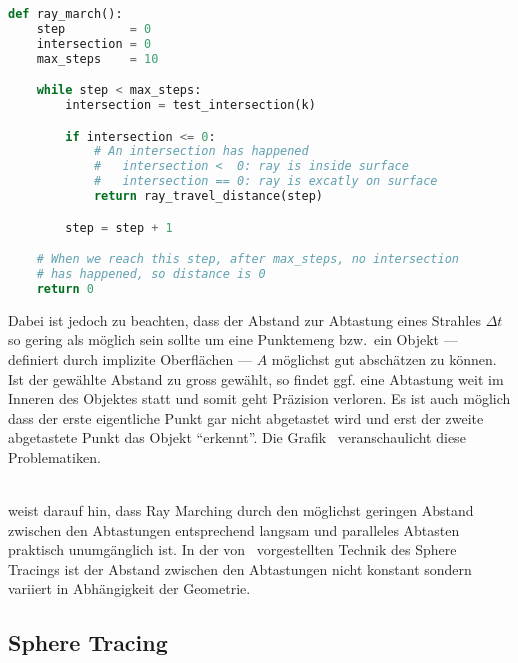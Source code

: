 \begin{lstlisting}[language=Python,caption={Eine abstrakte Umsetzung des Ray
        Marchings\protect\footnotemark.},label={fig:ray_marching},captionpos=b,emph={ray_march}]
def ray_march():
    step         = 0
    intersection = 0
    max_steps    = 10

    while step < max_steps:
        intersection = test_intersection(k)

        if intersection <= 0:
            # An intersection has happened
            #   intersection <  0: ray is inside surface
            #   intersection == 0: ray is excatly on surface
            return ray_travel_distance(step)

        step = step + 1

    # When we reach this step, after max_steps, no intersection
    # has happened, so distance is 0
    return 0
\end{lstlisting}

Dabei ist jedoch zu beachten, dass der Abstand zur Abtastung eines Strahles
$\Delta t$ so gering als möglich sein sollte um eine Punktemeng bzw.\ ein
Objekt --- definiert durch implizite Oberflächen --- $A$ möglichst gut
abschätzen zu können. Ist der gewählte Abstand zu gross gewählt, so findet ggf.
eine Abtastung weit im Inneren des Objektes statt und somit geht Präzision
verloren.  Es ist auch möglich dass der erste eigentliche Punkt gar nicht
abgetastet wird und erst der zweite abgetastete Punkt das Objekt ``erkennt''.
Die Grafik~ veranschaulicht diese
Problematiken.\\
\\

\cite{hart_sphere_1994} weist darauf hin, dass Ray Marching durch den möglichst
geringen Abstand zwischen den Abtastungen entsprechend langsam und paralleles
Abtasten praktisch unumgänglich ist. In der von~\cite{hart_sphere_1994}
vorgestellten Technik des Sphere Tracings ist der Abstand zwischen den
Abtastungen nicht konstant sondern variiert in Abhängigkeit der Geometrie.

\subsection{Sphere Tracing}
\label{subsec:sphere_tracing}

